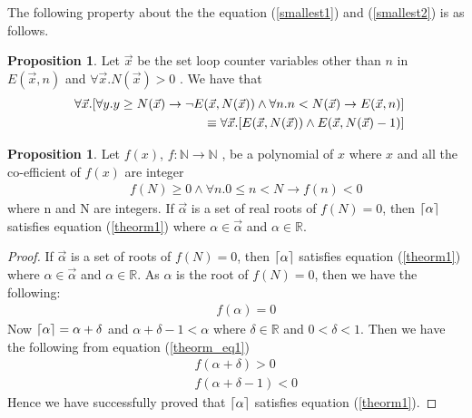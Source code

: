 \documentclass[12pt]{extarticle}
\DeclarePairedDelimiter\ceil{\lceil}{\rceil}
\theoremstyle{definition}
\newtheorem{proposition}[theorem]{Proposition}
\begin{document}
The following property about the the equation (\ref{smallest1}) and (\ref{smallest2})  is as follows.
\begin{proposition}\label{propos1} Let $\vec{x}$ be the set loop counter variables other than $n$ in $E(\vec{x},n)$ and $\forall \vec{x}.N(\vec{x}) >0$ . We have that
\begin{eqnarray*}
    &&\hspace*{-4em}\forall \vec{x}.[\forall y.y\geq N(\vec{x}) \rightarrow \neg E(\vec{x},N(\vec{x})) \land \forall n. n< N(\vec{x})\rightarrow  E(\vec{x},n)] \\
    &&\hspace*{10em}\equiv \forall \vec{x}.[E(\vec{x},N(\vec{x})) \land E(\vec{x},N(\vec{x})-1)]  
\end{eqnarray*}
\end{proposition}
\begin{proposition}\label{propos2}
Let $f(x)$, $f:\mathbb{N}\rightarrow \mathbb{N}$ , be a polynomial of $x$ where $x$ and all the co-efficient of $f(x)$ are integer 
\begin{eqnarray}
	&&f(N)\geq 0 \land \forall n.0\leq n < N \rightarrow f(n)<0\label{theorm1} \label{theorm2}
\end{eqnarray}
where n and N are integers. If $\vec{\alpha}$ is a set of real roots of $f(N)=0$, then $\ceil*{\alpha}$ satisfies equation (\ref{theorm1})  where $\alpha \in \vec{\alpha}$ and $\alpha \in \mathbb{R}$. 
\end{proposition}
\begin{proof}
If $\vec{\alpha}$ is a set of roots of $f(N)=0$, then $\ceil*{\alpha}$ satisfies equation (\ref{theorm1}) where $\alpha \in \vec{\alpha}$ and $\alpha \in \mathbb{R}$.
As $\alpha$ is the root of $f(N)=0$, then we have the following:
    \begin{eqnarray}
    &&f(\alpha)=0\label{theorm_eq1}
    \end{eqnarray}
Now $\ceil*{\alpha}=\alpha+\delta$ and $\alpha+\delta-1<\alpha$ where $\delta \in \mathbb{R}$ and $0<\delta<1$. Then we have the following from equation (\ref{theorm_eq1})
    \begin{eqnarray}
    &&f(\alpha+\delta)>0\label{theorm_eq2}\\
    &&f(\alpha+\delta-1)<0\label{theorm_eq3}
    \end{eqnarray}
Hence we have successfully proved that $\ceil*{\alpha}$ satisfies equation (\ref{theorm1}).
\end{proof}
\end{document}
